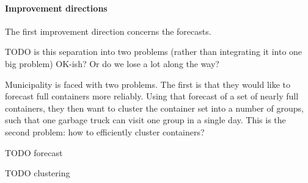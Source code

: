 \documentclass[a4paper, 12pt]{article}
\begin{document}
    \paragraph{Improvement directions}
    The first improvement direction concerns the forecasts.

    TODO is this separation into two problems (rather than integrating it into one big problem) OK-ish?
    Or do we lose a lot along the way?

    Municipality is faced with two problems.
    The first is that they would like to forecast full containers more reliably.
    Using that forecast of a set of nearly full containers, they then want to cluster the container set into a number of groups, such that one garbage truck can visit one group in a single day.
    This is the second problem: how to efficiently cluster containers?

    TODO forecast

    TODO clustering

    \clearpage
    \printbibliography
\end{document}
